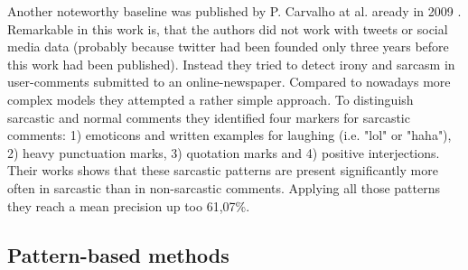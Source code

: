 \documentclass[sigconf,  review=false, nonacm=true]{acmart}
\begin{document}
Another noteworthy baseline was published by P. Carvalho at al. aready in 2009 \cite{Clues-for-Detecting-Irony-in-User-Generated-Contents}. Remarkable in this work is, that the authors did not work with tweets or social media data (probably because twitter had been founded only three years before this work had been published). Instead they tried to detect irony and sarcasm in user-comments submitted to an online-newspaper. 
Compared to nowadays more complex models they attempted a rather simple approach. To distinguish sarcastic and normal comments they identified four markers for sarcastic comments: 1) emoticons and written examples for laughing (i.e. "lol" or "haha"), 2) heavy punctuation marks, 3) quotation marks and 4) positive interjections.
Their works shows that these sarcastic patterns are present significantly more often in sarcastic than in non-sarcastic comments. Applying all those patterns they reach a mean precision up too 61,07\%.


\subsection{Pattern-based methods}
\end{document}

